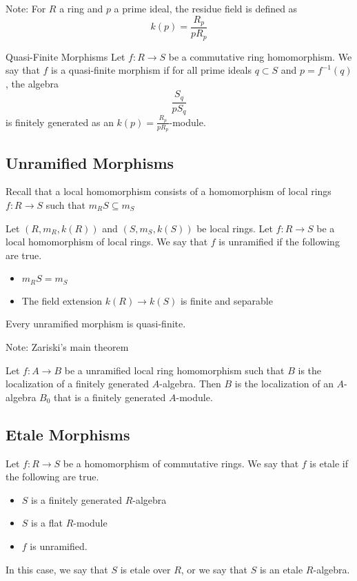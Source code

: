 \documentclass[a4paper]{article}
\begin{document}
Note: For $R$ a ring and $p$ a prime ideal, the residue field is defined as $$k(p)=\frac{R_p}{pR_p}$$

\begin{defn}{Quasi-Finite Morphisms}{} Let $f:R\to S$ be a commutative ring homomorphism. We say that $f$ is a quasi-finite morphism if for all prime ideals $q\subset S$ and $p=f^{-1}(q)$, the algebra $$\frac{S_q}{pS_q}$$ is finitely generated as an $k(p)=\frac{R_p}{pR_p}$-module. 
\end{defn}

\subsection{Unramified Morphisms}
Recall that a local homomorphism consists of a homomorphism of local rings $f:R\to S$ such that $m_RS\subseteq m_S$

\begin{defn}{}{} Let $(R,m_R,k(R))$ and $(S,m_S,k(S))$ be local rings. Let $f:R\to S$ be a local homomorphism of local rings. We say that $f$ is unramified if the following are true. 
\begin{itemize}
\item $m_RS=m_S$
\item The field extension $k(R)\to k(S)$ is finite and separable
\end{itemize}
\end{defn}

\begin{lmm}{}{} Every unramified morphism is quasi-finite. 
\end{lmm}

Note: Zariski's main theorem

\begin{prp}{}{} Let $f:A\to B$ be a unramified local ring homomorphism such that $B$ is the localization of a finitely generated $A$-algebra. Then $B$ is the localization of an $A$-algebra $B_0$ that is a finitely generated $A$-module. 
\end{prp}

\subsection{Etale Morphisms}
\begin{defn}{}{} Let $f:R\to S$ be a homomorphism of commutative rings. We say that $f$ is etale if the following are true. 
\begin{itemize}
\item $S$ is a finitely generated $R$-algebra
\item $S$ is a flat $R$-module
\item $f$ is unramified. 
\end{itemize}
In this case, we say that $S$ is etale over $R$, or we say that $S$ is an etale $R$-algebra. 
\end{defn}
\end{document}
